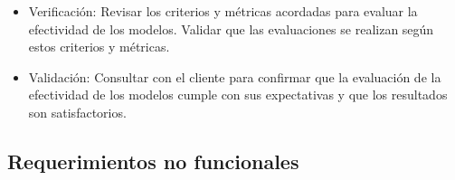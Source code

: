 \documentclass[
11pt, %
codirector, %
]{charter}
\begin{document}
\begin{itemize}
\begin{itemize}
	\item Verificación: Revisar los criterios y métricas acordadas para evaluar la efectividad de los modelos. Validar que las evaluaciones se realizan según estos criterios y métricas.
	\item Validación: Consultar con el cliente para confirmar que la evaluación de la efectividad de los modelos cumple con sus expectativas y que los resultados son satisfactorios.
\end{itemize}
\end{itemize}

\subsection{Requerimientos no funcionales}
\end{document}
